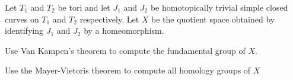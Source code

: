 Let $T_1$ and $T_2$ be tori and let $J_1$ and $J_2$ be homotopically
trivial simple closed curves on $T_1$ and $T_2$ respectively. Let $X$
be the quotient space obtained by identifying $J_1$ and $J_2$ by a
homeomorphism.
\begin{alist}
\item Use Van Kampen's theorem to compute the fundamental group of
$X$.
\item Use the Mayer-Vietoris theorem to compute all homology groups of
$X$
\end{alist}
